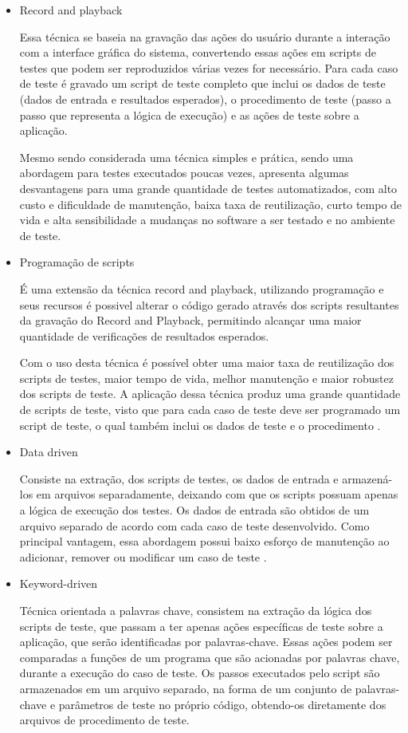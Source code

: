 \begin{itemize}

	\item Record and playback 
	
Essa técnica se baseia na gravação das ações do usuário durante a interação com a interface gráfica do sistema, convertendo essas ações em scripts de testes que podem ser reproduzidos várias vezes for necessário. Para cada caso de teste é gravado um script de teste completo que inclui os dados de teste (dados de entrada e resultados esperados), o procedimento de teste (passo a passo que representa a lógica de execução) e as ações de teste sobre a aplicação.

Mesmo sendo considerada uma técnica simples e prática, sendo uma abordagem para testes executados poucas vezes, apresenta algumas desvantagens para uma grande quantidade de testes automatizados, com alto custo e dificuldade de manutenção, baixa taxa de reutilização, curto tempo de vida e alta sensibilidade a mudanças no software a ser testado e no ambiente
de teste.

	\item Programação de scripts 
	
É uma extensão da técnica record and playback, utilizando programação e seus recursos é possivel alterar o código gerado através dos scripts resultantes da gravação do Record and Playback, permitindo alcançar uma maior quantidade de verificações de resultados esperados. 

Com o uso desta técnica é possível obter uma maior taxa de reutilização dos scripts de testes, maior tempo de vida, melhor manutenção e maior robustez dos scripts de teste. A aplicação dessa técnica produz uma grande quantidade de scripts de teste, visto que para cada caso de teste deve ser programado um script de teste, o qual também inclui os dados de teste e o procedimento \cite{Fantinato2004}.

	\item Data driven 
	
Consiste na extração, dos scripts de testes, os dados de entrada e armazená-los em arquivos separadamente, deixando com que os scripts possuam apenas a lógica de execução dos testes. Os dados de entrada são obtidos de um arquivo separado de acordo com cada caso de teste desenvolvido. Como principal vantagem, essa abordagem possui baixo esforço de manutenção ao adicionar, remover ou modificar um caso de teste \cite{Zambelich1998}.

	\item Keyword-driven 
	
Técnica orientada a palavras chave, consistem na extração da lógica dos scripts de teste, que passam a ter apenas ações específicas de teste sobre a aplicação, que serão identificadas por palavras-chave. Essas ações  podem ser comparadas a funções de um programa que são acionadas por palavras chave, durante a execução do caso de teste. Os passos executados pelo script são armazenados em um arquivo separado, na forma de um conjunto de palavras-chave e parâmetros de teste no próprio código, obtendo-os diretamente dos arquivos de procedimento de teste.
\end{itemize}


